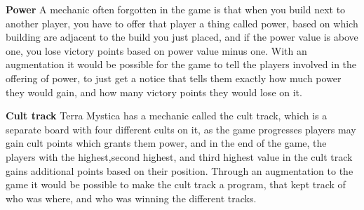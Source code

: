 \textbf{Power}
A mechanic often forgotten in the game is that when you build next to another player, you have to offer that player a thing called power, based on which building are adjacent to the build you just placed, and if the power value is above one, you lose victory points based on power value minus one. With an augmentation it would be possible for the game to tell the players involved in the offering of power, to just get a notice that tells them exactly how much power they would gain, and how many victory points they would lose on it.

\textbf{Cult track}
Terra Mystica has a mechanic called the cult track, which is a separate board with four different cults on it, as the game progresses players may gain cult points which grants them power, and in the end of the game, the players with the highest,second highest, and third highest value in the cult track gains additional points based on their position. Through an augmentation to the game it would be possible to make the cult track a program, that kept track of who was where, and who was winning the different tracks. 
